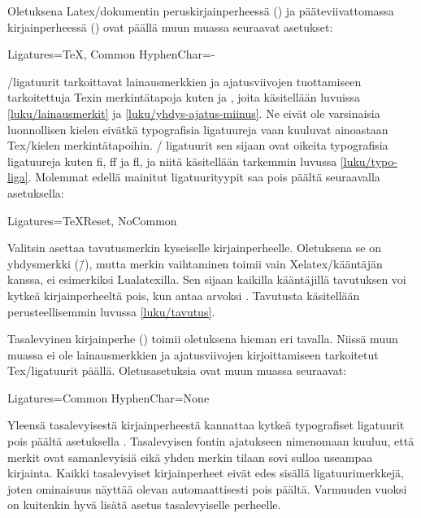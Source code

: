 Oletuksena Latex\-/dokumentin peruskirjainperheessä
() ja pääteviivattomassa kirjainperheessä
() ovat päällä muun muassa seuraavat asetukset:%

\begin{koodilohkosis}
Ligatures={TeX, Common}
HyphenChar=-
\end{koodilohkosis}

\noindent
{}\-/ligatuurit tarkoittavat lainausmerkkien ja ajatusviivojen
tuottamiseen tarkoitettuja Texin merkintätapoja kuten  ja
\koodi{\==}, joita käsitellään luvuissa \ref{luku/lainausmerkit} ja
\ref{luku/yhdys-ajatus-miinus}. Ne eivät ole varsinaisia luonnollisen
kielen eivätkä typografisia ligatuureja vaan kuuluvat ainoastaan
Tex\-/kielen merkintätapoihin. \-/ ligatuurit sen sijaan
ovat oikeita typografisia ligatuureja kuten fi, ff ja fl, ja niitä
käsitellään tarkemmin luvussa \ref{luku/typo-liga}. Molemmat edellä
mainitut ligatuurityypit saa pois päältä seuraavalla asetuksella:

\begin{koodilohkosis}
Ligatures={TeXReset, NoCommon}
\end{koodilohkosis}

\noindent
Valitsin  asettaa tavutusmerkin kyseiselle
kirjainperheelle. Oletuksena se on yhdysmerkki (\=/), mutta merkin
vaihtaminen toimii vain Xelatex\-/kääntäjän kanssa, ei esimerkiksi
Lualatexilla. Sen sijaan kaikilla kääntäjillä tavutuksen voi kytkeä
kirjainperheeltä pois, kun antaa arvoksi . Tavutusta
käsitellään perusteellisemmin luvussa \ref{luku/tavutus}.

Tasalevyinen kirjainperhe () toimii oletuksena
hieman eri tavalla. Niissä muun muassa ei ole lainausmerkkien ja
ajatusviivojen kirjoittamiseen tarkoitetut Tex\-/ligatuurit päällä.
Oletusasetuksia ovat muun muassa seuraavat:

\begin{koodilohkosis}
Ligatures=Common
HyphenChar=None
\end{koodilohkosis}

\noindent
Yleensä tasalevyisestä kirjainperheestä kannattaa kytkeä typografiset
ligatuurit pois päältä asetuksella .
Tasalevyisen fontin ajatukseen nimenomaan kuuluu, että merkit ovat
samanlevyisiä eikä yhden merkin tilaan sovi sulloa useampaa kirjainta.
Kaikki tasalevyiset kirjainperheet eivät edes sisällä ligatuurimerkkejä,
joten ominaisuus näyttää olevan automaattisesti pois päältä. Varmuuden
vuoksi on kuitenkin hyvä lisätä asetus  tasalevyiselle perheelle.

